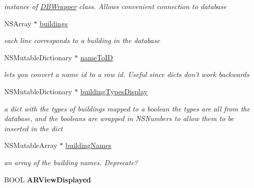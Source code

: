 \begin{DoxyCompactItemize}
\begin{DoxyCompactList}\small\item\em instance of \hyperlink{interface_d_b_wrapper}{D\-B\-Wrapper} class. Allows convenient connection to database \end{DoxyCompactList}\item 
\hypertarget{interface_virt_tour_view_controller_aa53282dbe189663761e54e01a75121cc}{N\-S\-Array $\ast$ \hyperlink{interface_virt_tour_view_controller_aa53282dbe189663761e54e01a75121cc}{buildings}}\label{interface_virt_tour_view_controller_aa53282dbe189663761e54e01a75121cc}

\begin{DoxyCompactList}\small\item\em each line corresponds to a building in the database \end{DoxyCompactList}\item 
\hypertarget{interface_virt_tour_view_controller_a3b947ea6774d26876b8139dadcc71237}{N\-S\-Mutable\-Dictionary $\ast$ \hyperlink{interface_virt_tour_view_controller_a3b947ea6774d26876b8139dadcc71237}{name\-To\-I\-D}}\label{interface_virt_tour_view_controller_a3b947ea6774d26876b8139dadcc71237}

\begin{DoxyCompactList}\small\item\em lets you convert a name id to a row id. Useful since dicts don't work backwards \end{DoxyCompactList}\item 
\hypertarget{interface_virt_tour_view_controller_aefcd90476e5b99300fc28598ae858be1}{N\-S\-Mutable\-Dictionary $\ast$ \hyperlink{interface_virt_tour_view_controller_aefcd90476e5b99300fc28598ae858be1}{building\-Types\-Display}}\label{interface_virt_tour_view_controller_aefcd90476e5b99300fc28598ae858be1}

\begin{DoxyCompactList}\small\item\em a dict with the types of buildings mapped to a boolean  the types are all from the database, and the booleans are wrapped in N\-S\-Numbers to allow them to be inserted in the dict \end{DoxyCompactList}\item 
\hypertarget{interface_virt_tour_view_controller_a3d45bf4e9fd3a874e5f4a32d52024df4}{N\-S\-Mutable\-Array $\ast$ \hyperlink{interface_virt_tour_view_controller_a3d45bf4e9fd3a874e5f4a32d52024df4}{building\-Names}}\label{interface_virt_tour_view_controller_a3d45bf4e9fd3a874e5f4a32d52024df4}

\begin{DoxyCompactList}\small\item\em an array of the building names. Deprecate? \end{DoxyCompactList}\item 
\hypertarget{interface_virt_tour_view_controller_a6c9fdfddaf711a7fb5dea897beb27b76}{B\-O\-O\-L {\bfseries A\-R\-View\-Displayed}}\label{interface_virt_tour_view_controller_a6c9fdfddaf711a7fb5dea897beb27b76}

\end{DoxyCompactItemize}


